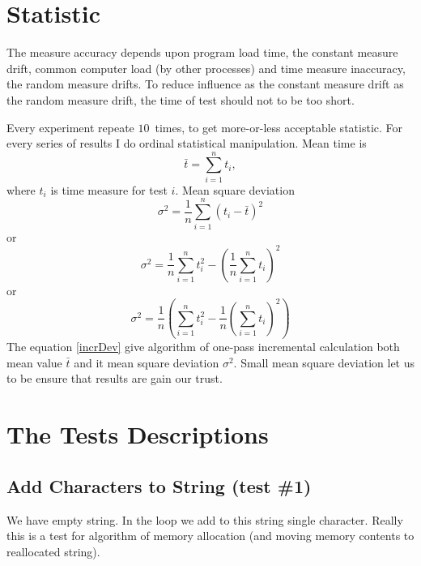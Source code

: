 \documentclass[a4paper]{article}
\begin{document}
\section{Statistic}

The measure accuracy
depends upon program load time, the constant measure drift, common computer load (by other processes) and time measure inaccuracy, the random measure drifts.
To reduce influence as the constant measure drift as the random measure drift, the time of test should not to be too short.

Every experiment repeate $10$~times, to get more-or-less acceptable statistic.
For every series of results I do ordinal statistical manipulation.
Mean time is
\begin{equation}
\bar t = \sum_{i = 1}^{n} t_i,
\end{equation}
where $t_i$ is time measure for test $i$.
Mean square deviation
\begin{equation}
\sigma^2 = \frac{1}{n}\sum_{i = 1}^{n} (t_i - \bar t)^2
\end{equation}
or
\begin{equation}
\sigma^2 = \frac{1}{n}\sum_{i = 1}^{n} t_i^2 - \left(\frac{1}{n}\sum_{i = 1}^{n} t_i\right)^2
\end{equation}
or
\begin{equation}
\sigma^2 = \frac{1}{n} \left(\sum_{i = 1}^{n} t_i^2 - 
                        \frac{1}{n}\left(\sum_{i = 1}^{n} t_i\right)^2\right)\label{incrDev}
\end{equation}
The equation \ref{incrDev} give algorithm of one-pass incremental calculation
both mean value $\bar t$ and it mean square deviation $\sigma^2$.
Small mean square deviation let us to be ensure that results are gain our trust.


\section{The Tests Descriptions\label{TestsDescr}}

\subsection{Add Characters to String\label{incr-string}
(test \#1)}

We have empty string. In the loop we add to this string single
character.
Really this is a test for algorithm
of memory allocation (and moving memory contents to reallocated string).


\end{document}
